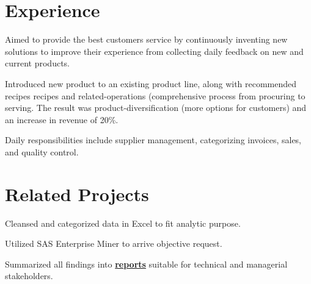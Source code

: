 \documentclass[letterpaper]{deedy-resume} %
\begin{document}
\begin{minipage}[t]{0.66\textwidth} %


\section{Experience}
\vspace{\topsep} %
\begin{tightitemize}
\item Aimed to provide the best customers service by continuously inventing new solutions to improve their experience from collecting daily feedback on new and current products.
\item Introduced new product to an existing product line, along with recommended recipes recipes and related-operations (comprehensive process from procuring to serving. The result was product-diversification (more options for customers) and an increase in revenue of 20\%.
\item Daily responsibilities include supplier management, categorizing invoices, sales, and quality control.
\end{tightitemize}
\sectionspace %




\section{Related Projects}

\begin{tightitemize}
\item Cleansed and categorized data in Excel to fit analytic purpose.
\item Utilized SAS Enterprise Miner to arrive objective request.
\item Summarized all findings into \href{https://drive.google.com/file/d/0B7mZbJb-qiSUWnc4b3dWMGVZT2M/view?usp=sharing}{\bf reports} suitable for technical and managerial stakeholders.
\end{tightitemize}


\end{minipage}
\end{document}
